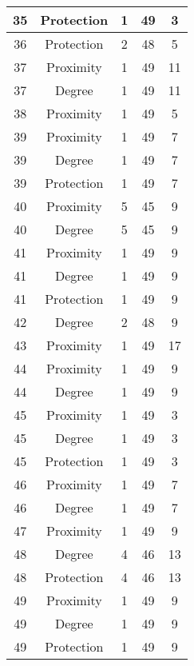 \documentclass[results.tex]{subfiles}
\begin{document}
\begin{center}
\begin{tabular}{| c || c | c | c | c |}
    \hline
    35 & Protection & 1 & 49 & 3 \\ 
    \hline
    36 & Protection & 2 & 48 & 5 \\ 
    \hline
    37 & Proximity & 1 & 49 & 11 \\ 
    \hline
    37 & Degree & 1 & 49 & 11 \\ 
    \hline
    38 & Proximity & 1 & 49 & 5 \\ 
    \hline
    39 & Proximity & 1 & 49 & 7 \\ 
    \hline
    39 & Degree & 1 & 49 & 7 \\ 
    \hline
    39 & Protection & 1 & 49 & 7 \\ 
    \hline
    40 & Proximity & 5 & 45 & 9 \\ 
    \hline
    40 & Degree & 5 & 45 & 9 \\ 
    \hline
    41 & Proximity & 1 & 49 & 9 \\ 
    \hline
    41 & Degree & 1 & 49 & 9 \\ 
    \hline
    41 & Protection & 1 & 49 & 9 \\ 
    \hline
    42 & Degree & 2 & 48 & 9 \\ 
    \hline
    43 & Proximity & 1 & 49 & 17 \\ 
    \hline
    44 & Proximity & 1 & 49 & 9 \\ 
    \hline
    44 & Degree & 1 & 49 & 9 \\ 
    \hline
    45 & Proximity & 1 & 49 & 3 \\ 
    \hline
    45 & Degree & 1 & 49 & 3 \\ 
    \hline
    45 & Protection & 1 & 49 & 3 \\ 
    \hline
    46 & Proximity & 1 & 49 & 7 \\ 
    \hline
    46 & Degree & 1 & 49 & 7 \\ 
    \hline
    47 & Proximity & 1 & 49 & 9 \\ 
    \hline
    48 & Degree & 4 & 46 & 13 \\ 
    \hline
    48 & Protection & 4 & 46 & 13 \\ 
    \hline
    49 & Proximity & 1 & 49 & 9 \\ 
    \hline
    49 & Degree & 1 & 49 & 9 \\ 
    \hline
    49 & Protection & 1 & 49 & 9 \\ 
    \hline   \end{tabular}
\end{center}
\end{document}
